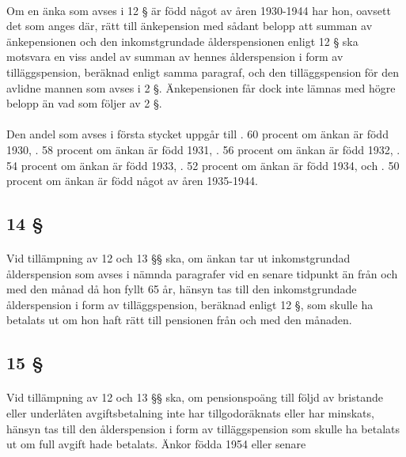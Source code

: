 \documentclass[a4paper,notitlepage,openany,10pt]{book}
\begin{document}
\paragraph*{}
Om en änka som avses i 12 § är född något av åren 1930-1944 har hon, oavsett det som anges där, rätt till änkepension med sådant belopp att summan av änkepensionen och den inkomstgrundade ålderspensionen enligt 12 § ska motsvara en viss andel av summan av hennes ålderspension i form av tilläggspension, beräknad enligt samma paragraf, och den tilläggspension för den avlidne mannen som avses i 2 §.
Änkepensionen får dock inte lämnas med högre belopp än vad som följer av 2 §.
\paragraph*{}
Den andel som avses i första stycket uppgår till
. 60 procent om änkan är född 1930,
. 58 procent om änkan är född 1931,
. 56 procent om änkan är född 1932,
. 54 procent om änkan är född 1933,
. 52 procent om änkan är född 1934, och
. 50 procent om änkan är född något av åren 1935-1944.
\subsection*{14 §}
\paragraph*{}
Vid tillämpning av 12 och 13 §§ ska, om änkan tar ut inkomstgrundad ålderspension som avses i nämnda paragrafer vid en senare tidpunkt än från och med den månad då hon fyllt 65 år, hänsyn tas till den inkomstgrundade ålderspension i form av tilläggspension, beräknad enligt 12 §, som skulle ha betalats ut om hon haft rätt till pensionen från och med den månaden.
\subsection*{15 §}
\paragraph*{}
Vid tillämpning av 12 och 13 §§ ska, om pensionspoäng till följd av bristande eller underlåten avgiftsbetalning inte har tillgodoräknats eller har minskats, hänsyn tas till den ålderspension i form av tilläggspension som skulle ha betalats ut om full avgift hade betalats.
Änkor födda 1954 eller senare
\end{document}
